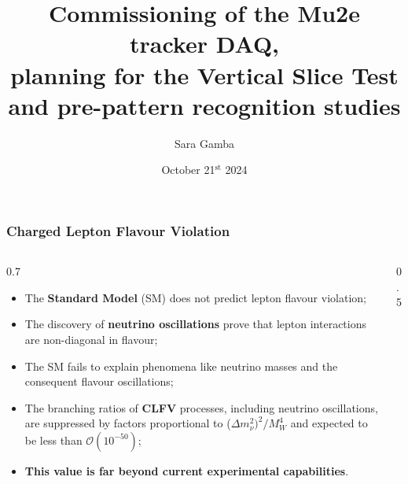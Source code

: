 \documentclass{beamer}
\title[Titolo breve]{Commissioning of the Mu2e tracker DAQ,\\ \vspace{1mm}planning for the Vertical Slice Test\\\vspace{1mm}and pre-pattern recognition studies}
\institute{Università di Pisa}
\author[Sara Gamba]{\small{Sara Gamba}}
\date[21/10/24]{\small{October 21$^{\text{st}}$ 2024}}
\begin{document}
	
\begin{frame}
\setTitlestyleDissertation
\maketitle
\end{frame}


\begin{frame}
    \frametitle{Charged Lepton Flavour Violation}
    \vspace{-2mm}
\begin{columns}
    \begin{column}{0.7\framewidth}
        \begin{itemize}
            \item The \textbf{Standard Model} (SM) does not predict lepton flavour violation;
            \vspace{1mm}
            \item The discovery of \textbf{neutrino oscillations} prove that lepton interactions are non-diagonal in flavour; \textcolor{white}{\cite{Bernstein_2013} \cite{Kargiantoulakis_2020} \cite{universe9010054}}
            \vspace{1mm}
            \item The SM fails to explain phenomena like neutrino masses and the consequent flavour oscillations;\textcolor{white}{\cite{clfv_signorelli} \cite{bartoszek2015mu2e} \cite{bobbb} \cite{kola}}
            \vspace{1mm}
            \item The branching ratios of \textbf{CLFV}
            processes, including neutrino
            oscillations, are suppressed by factors
            proportional to ($\Delta m_\nu^2)^2 /M^4_W$ and expected to be less than $\mathcal{O}(10^{-50})$;
            \vspace{1mm}
            \item \textbf{This value is far beyond current experimental capabilities}.
        \end{itemize}
    \end{column}
    \begin{column}{0.5\framewidth}

\end{column}
\end{columns}
\end{frame}
\end{document}
